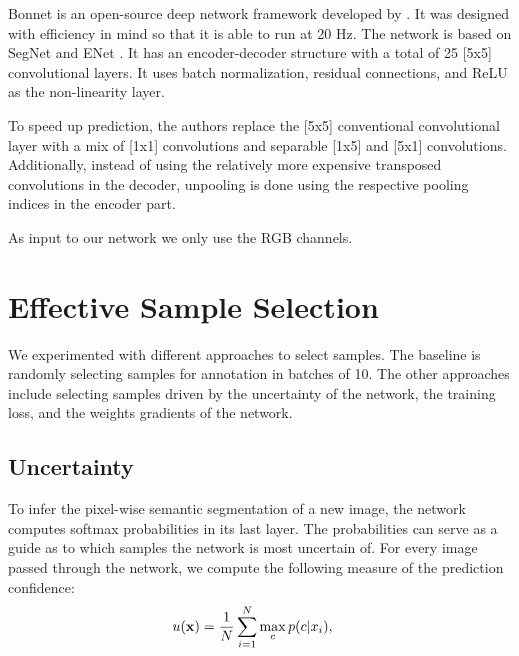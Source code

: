 \documentclass[letterpaper, 10 pt, conference]{ieeeconf}  %
\begin{document}
Bonnet is an open-source deep network framework developed by \cite{milioto2018bonnet}. It was designed with efficiency in mind so that it is able to run at 20 Hz. The network is based on SegNet \cite{badrinarayanan2017segnet} and ENet \cite{paszke2016enet}. It has an encoder-decoder structure with a total of 25 [5x5] convolutional layers. It uses batch normalization, residual connections, and ReLU as the non-linearity layer. 

To speed up prediction, the authors replace the [5x5] conventional convolutional layer with a mix of [1x1] convolutions and separable [1x5] and [5x1] convolutions. Additionally, instead of using the relatively more expensive transposed convolutions in the decoder, unpooling is done using the respective pooling indices in the encoder part.

As input to our network we only use the RGB channels.


%
%
%
%
%
%


\section{Effective Sample Selection}

We experimented with different approaches to select samples. The baseline is randomly selecting samples for annotation in batches of 10. The other approaches include selecting samples driven by the uncertainty of the network, the training loss, and the weights gradients of the network.   


\subsection{Uncertainty}

To infer the pixel-wise semantic segmentation of a new image, the network computes softmax probabilities in its last layer. The probabilities can serve as a guide as to which samples the network is most uncertain of. For every image passed through the network, we compute the following measure of the prediction confidence:
\begin{align}
u(\bold{x}) &= \frac{1}{N} \sum_{i=1}^N \max_c p(c|x_i),
\end{align}  
\end{document}

